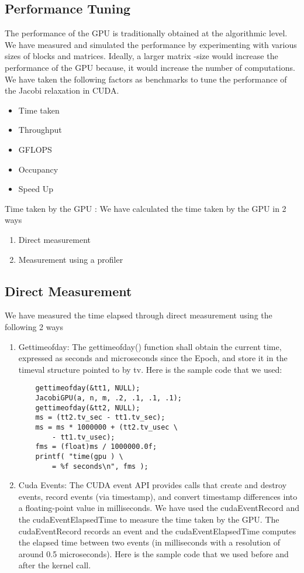 \documentclass[10pt]{article}
\begin{document}
\begin{multicols}{2}
    \subsection{Performance Tuning}
    The performance of the GPU is traditionally obtained at the algorithmic level.
    We have measured and simulated the performance by experimenting with various sizes of blocks and matrices.
    Ideally, a larger matrix -size would increase the performance of the GPU because,  it would increase  the  number of computations.
    We have taken the following factors as benchmarks to tune the performance of the Jacobi relaxation in CUDA.
    \begin{itemize}
    \item Time taken
    \item Throughput
    \item GFLOPS
    \item Occupancy
    \item Speed Up
    \end{itemize}
    Time taken by the GPU  : We have calculated the time taken by the GPU in 2 ways
    \begin{enumerate}
    \item Direct measurement
    \item Measurement using a profiler
    \end{enumerate}

    \subsection{Direct Measurement} 
    We have measured the time elapsed through direct measurement using the following 2 ways
    \begin{enumerate}
    \item Gettimeofday: The gettimeofday() function shall obtain the current time, expressed as seconds and microseconds since the Epoch, and store it in the timeval structure pointed to by tv.
    Here is the sample code that we used:

    \begin{verbatim}
    gettimeofday(&tt1, NULL);
    JacobiGPU(a, n, m, .2, .1, .1, .1);
    gettimeofday(&tt2, NULL);
    ms = (tt2.tv_sec - tt1.tv_sec);
    ms = ms * 1000000 + (tt2.tv_usec \
        - tt1.tv_usec);
    fms = (float)ms / 1000000.0f;
    printf( "time(gpu ) \
        = %f seconds\n", fms );
    \end{verbatim}

    \item Cuda Events: The CUDA event API provides calls that create and destroy events, record events (via timestamp), and convert timestamp differences into a floating-point value in milliseconds.
    We have used the cudaEventRecord and the cudaEventElapsedTime to  measure the time taken by the GPU.
    The cudaEventRecord records an event and the cudaEventElapsedTime  computes the elapsed time between two events (in milliseconds with a resolution of around 0.5 microseconds).
    Here is the sample code that we used before and after the kernel call. 


\end{enumerate}
\end{multicols}
\end{document}
